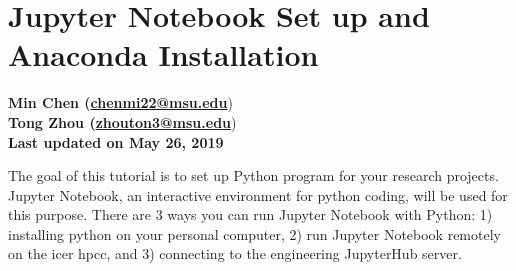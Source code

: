 \documentclass[12pt]{article}   	%
\begin{document}
\section*{Jupyter Notebook Set up and Anaconda Installation}

\textbf{Min Chen (\href{chenmi22@msu.edu}{chenmi22@msu.edu}}) \\ 
\textbf{Tong Zhou (\href{zhouton3@msu.edu}{zhouton3@msu.edu}}) \\ 
\textbf{Last updated on May 26, 2019}

The goal of this tutorial is to set up Python program for your research projects. Jupyter Notebook, an interactive environment for python coding, will be used for this purpose. 
There are 3 ways you can run Jupyter Notebook with Python: 1) installing python on your personal computer, 2) run Jupyter Notebook remotely on the icer hpcc, and 3) connecting to the engineering JupyterHub server.
\end{document}
